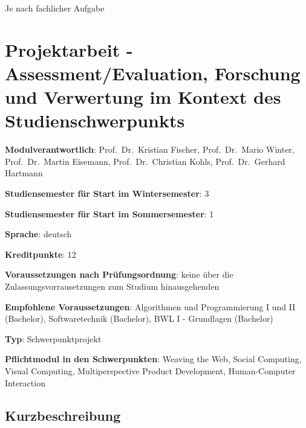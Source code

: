 Je nach fachlicher Aufgabe

\chapter{Projektarbeit - Assessment/Evaluation, Forschung und Verwertung
im Kontext des
Studienschwerpunkts\label{/mi-2017/modulbeschreibungen-master/MA_Modul_Projekt_Verwertung}}\label{projektarbeit---assessmentevaluation-forschung-und-verwertung-im-kontext-des-studienschwerpunktspathlabelmi-2017modulbeschreibungen-mastermaux5fmodulux5fprojektux5fverwertung}

\begin{modulHead}
\textbf{Modulverantwortlich}: Prof.~Dr.~Kristian
Fischer, Prof.~Dr.~Mario Winter, Prof.~Dr.~Martin Eisemann,
Prof.~Dr.~Christian Kohls, Prof.~Dr.~Gerhard
Hartmann
\end{modulHead}
\begin{modulHead}
\textbf{Studiensemester für
Start im Wintersemester}:
3
\end{modulHead}
\begin{modulHead}
\textbf{Studiensemester für Start
im Sommersemester}:
1
\end{modulHead}
\begin{modulHead}
\textbf{Sprache}:
deutsch
\end{modulHead}
\begin{modulHead}
\textbf{Kreditpunkte}:
12
\end{modulHead}
\begin{modulHead}
\textbf{Voraussetzungen nach
Prüfungsordnung}: keine über die Zulassungsvorrausetzungen zum Studium
hinausgehenden
\end{modulHead}
\begin{modulHead}
\textbf{Empfohlene
Voraussetzungen}: Algorithmen und Programmierung I und II (Bachelor),
Softwaretechnik (Bachelor), BWL I - Grundlagen
(Bachelor)
\end{modulHead}
\begin{modulHead}
\textbf{Typ}:
Schwerpunktprojekt
\end{modulHead}
\begin{modulHead}
\textbf{Pflichtmodul
in den Schwerpunkten}: Weaving the Web, Social Computing, Visual
Computing, Multiperspective Product Development, Human-Computer
Interaction
\end{modulHead}


\section*{Kurzbeschreibung\label{/mi-2017/modulbeschreibungen-master/MA_Modul_Projekt_Verwertung}}\label{kurzbeschreibungpathlabelmi-2017modulbeschreibungen-mastermaux5fmodulux5fprojektux5fverwertung}

